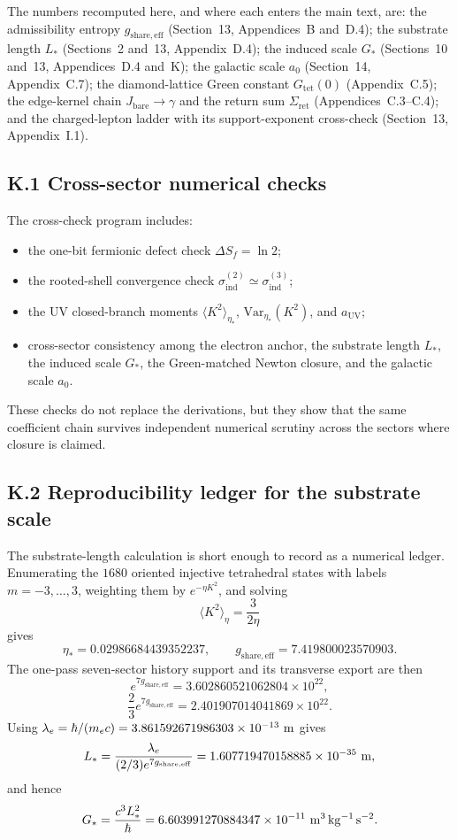 \documentclass[11pt]{article}
\begin{document}
The numbers recomputed here, and where each enters the main text, are: the admissibility entropy $g_{\mathrm{share,eff}}$ (Section~13, Appendices~B and~D.4); the substrate length $L_*$ (Sections~2 and~13, Appendix~D.4); the induced scale $G_*$ (Sections~10 and~13, Appendices~D.4 and~K); the galactic scale $a_0$ (Section~14, Appendix~C.7); the diamond-lattice Green constant $G_{\mathrm{tet}}(0)$ (Appendix~C.5); the edge-kernel chain $J_{\mathrm{bare}}\to\gamma$ and the return sum $\Sigma_{\mathrm{ret}}$ (Appendices~C.3--C.4); and the charged-lepton ladder with its support-exponent cross-check (Section~13, Appendix~I.1).

\subsection*{K.1 Cross-sector numerical checks}

The cross-check program includes:
\begin{itemize}
\item the one-bit fermionic defect check $\Delta S_f=\ln 2$;
\item the rooted-shell convergence check $\sigma_{\mathrm{ind}}^{(2)}\simeq \sigma_{\mathrm{ind}}^{(3)}$;
\item the UV closed-branch moments $\langle K^2\rangle_{\eta_*}$, $\mathrm{Var}_{\eta_*}(K^2)$, and $a_{\mathrm{UV}}$;
\item cross-sector consistency among the electron anchor, the substrate length $L_*$, the induced scale $G_*$, the Green-matched Newton closure, and the galactic scale $a_0$.
\end{itemize}
These checks do not replace the derivations, but they show that the same coefficient chain survives independent numerical scrutiny across the sectors where closure is claimed.

\subsection*{K.2 Reproducibility ledger for the substrate scale}

The substrate-length calculation is short enough to record as a numerical ledger. Enumerating the $1680$ oriented injective tetrahedral states with labels $m=-3,\ldots,3$, weighting them by $e^{-\eta K^2}$, and solving
\[
\langle K^2\rangle_\eta=\frac{3}{2\eta}
\]
gives
\[
\eta_*=0.02986684439352237,
\qquad
g_{\mathrm{share,eff}}=7.419800023570903.
\]
The one-pass seven-sector history support and its transverse export are then
\[
e^{7g_{\mathrm{share,eff}}}
=
3.602860521062804\times10^{22},
\]
\[
\frac23 e^{7g_{\mathrm{share,eff}}}
=
2.401907014041869\times10^{22}.
\]
Using $\lambda_e=\hbar/(m_ec)=3.861592671986303\times10^{-13}\ {\rm m}$ gives
\[
L_*=\frac{\lambda_e}{(2/3)e^{7g_{\mathrm{share,eff}}}}
=
1.607719470158885\times10^{-35}\ {\rm m},
\]
and hence
\[
G_*=\frac{c^3L_*^2}{\hbar}
=
6.603991270884347\times10^{-11}\ {\rm m^3\,kg^{-1}\,s^{-2}}.
\]
\end{document}
